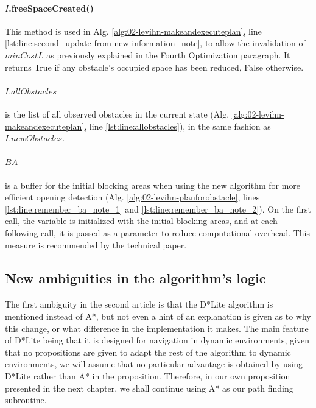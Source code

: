 \paragraph{$I$.freeSpaceCreated()} This method is used in Alg. \ref{alg:02-levihn-makeandexecuteplan}, line \ref{lst:line:second_update-from-new-information_note}, to allow the invalidation of $minCostL$ as previously explained in the Fourth Optimization paragraph. It returns True if any obstacle's occupied space has been reduced, False otherwise.

\paragraph{$I.allObstacles$} is the list of all observed obstacles in the current state (Alg. \ref{alg:02-levihn-makeandexecuteplan}, line \ref{lst:line:allobstacles}), in the same fashion as $I.newObstacles$.

\paragraph{$BA$} is a buffer for the initial blocking areas when using the new algorithm for more efficient opening detection (Alg. \ref{alg:02-levihn-planforobstacle}, lines \ref{lst:line:remember_ba_note_1} and \ref{lst:line:remember_ba_note_2}). On the first call, the variable is initialized with the initial blocking areas, and at each following call, it is passed as a parameter to reduce computational overhead. This measure is recommended by the technical paper.

\subsection{New ambiguities in the algorithm's logic}

\paragraph{} The first ambiguity in the second article \parencite{levihn_locally_2014} is that the D*Lite algorithm is mentioned instead of A*, but not even a hint of an explanation is given as to why this change, or what difference in the implementation it makes. The main feature of D*Lite being that it is designed for navigation in dynamic environments, given that no propositions are given to adapt the rest of the algorithm to dynamic environments, we will assume that no particular advantage is obtained by using D*Lite rather than A* in the proposition. Therefore, in our own proposition presented in the next chapter, we shall continue using A* as our path finding subroutine.

